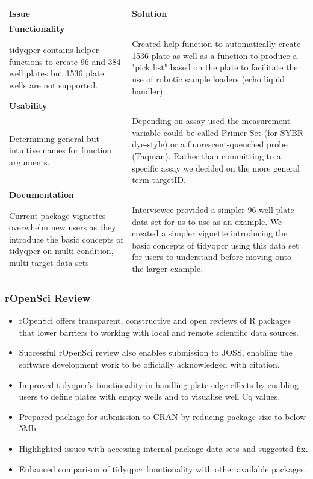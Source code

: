 \documentclass{SBCbookchapter}
\begin{document}
\begin{center}
\begin{tabular}{|| m{5.5cm} | m{8cm} ||} 
 \hline
 \textbf{\large Issue} & \textbf{\large Solution} \\ [0.5ex] 
 \hline\hline
 \multicolumn{2}{|l|}{\textbf{Functionality}} \\
 \hline
 tidyqpcr contains helper functions to create 96 and 384 well plates but 1536 plate wells are not supported. & Created help function to automatically create 1536 plate as well as a function to produce a "pick list" based on the plate to facilitate the use of robotic sample loaders (echo liquid handler). \\ 
 \hline
 \multicolumn{2}{|l|}{\textbf{Usability}} \\
 \hline
 Determining general but intuitive names for function arguments. & Depending on assay used the measurement variable could be called Primer Set (for SYBR dye-style) or a fluorescent-quenched probe (Taqman). Rather than committing to a specific assay we decided on the more general term targetID. \\
 \hline
 \multicolumn{2}{|l|}{\textbf{Documentation}} \\
 \hline
 Current package vignettes overwhelm new users as they introduce the basic concepts of tidyqpcr on multi-condition, multi-target data sets & Interviewee provided a simpler 96-well plate data set for us to use as an example. We created a simpler vignette introducing the basic concepts of tidyqpcr using this data set for users to understand before moving onto the larger example. \\
 \hline
\end{tabular}
\end{center}

\subsubsection{rOpenSci Review}

\begin{itemize}
    \item rOpenSci offers transparent, constructive and open reviews of R packages that lower barriers to working with local and remote scientific data sources.
    \item Successful rOpenSci review also enables submission to JOSS, enabling the software development work to be officially acknowledged with citation.
    \item Improved tidyqpcr's functionality in handling plate edge effects by enabling users to define plates with empty wells and to visualise well Cq values.
    \item Prepared package for submission to CRAN by reducing package size to below 5Mb.
    \item Highlighted issues with accessing internal package data sets and suggested fix.
    \item Enhanced comparison of tidyqpcr functionality with other available packages.
\end{itemize}
\end{document}
